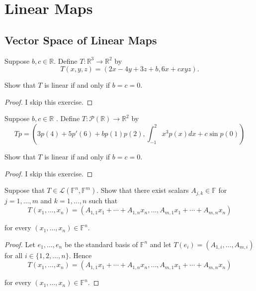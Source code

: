 \chapter{Linear Maps}

\section{Vector Space of Linear Maps}

\begin{exercise}
    Suppose $b, c\in\mathbb{R}$. Define $T: \mathbb{R}^{3}\to \mathbb{R}^{2}$ by
    \[
        T(x, y, z) = (2x - 4y + 3z + b, 6x + cxyz).
    \]

    Show that $T$ is linear if and only if $b = c = 0$.
\end{exercise}

\begin{proof}
    I skip this exercise.
\end{proof}
\newpage

\begin{exercise}
    Suppose $b, c \in \mathbb{R}$ . Define $T: \mathcal{P}(\mathbb{R})\to \mathbb{R}^{2}$ by
    \[
        Tp = \left( 3p(4) + 5p'(6) + bp(1)p(2), \int^{2}_{-1}x^{3}p(x)dx + c \sin p(0) \right)
    \]

    Show that $T$ is linear if and only if $b = c = 0$.
\end{exercise}

\begin{proof}
    I skip this exercise.
\end{proof}
\newpage

\begin{exercise}
    Suppose that $T\in \mathcal{L}(\mathbb{F}^{n}, \mathbb{F}^{m})$. Show that there exist scalars $A_{j,k}\in\mathbb{F}$ for $j = 1, \ldots, m$ and $k = 1, \ldots, n$ such that
    \[
        T(x_{1}, \ldots, x_{n}) = (A_{1,1}x_{1} + \cdots + A_{1,n}x_{n}, \ldots, A_{m,1}x_{1} + \cdots + A_{m,n}x_{n})
    \]

    for every $(x_{1}, \ldots, x_{n})\in\mathbb{F}^{n}$.
\end{exercise}

\begin{proof}
    Let $e_{1}, \ldots, e_{n}$ be the standard basis of $\mathbb{F}^{n}$ and let $T(e_{i}) = (A_{1,i}, \ldots, A_{m, i})$ for all $i\in\{ 1, 2, \ldots, n \}$. Hence
    \[
        T(x_{1}, \ldots, x_{n}) = (A_{1,1}x_{1} + \cdots + A_{1,n}x_{n}, \ldots, A_{m,1}x_{1} + \cdots + A_{m,n}x_{n})
    \]

    for every $(x_{1}, \ldots, x_{n})\in\mathbb{F}^{n}$.
\end{proof}
\newpage

